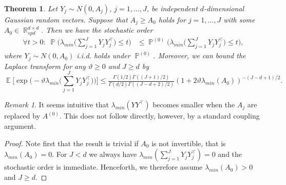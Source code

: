 \documentclass[preprint,aos]{imsart}
\numberwithin{equation}{section}
\newtheorem{theorem}[satz]{Theorem}
\theoremstyle{remark}
\newtheorem{remark}[satz]{Remark}
\DeclareMathOperator{\E}{{\mathbb E}}
\DeclareMathOperator{\R}{{\mathbb R}}
\DeclareMathOperator{\PP}{{\mathbb P}}
\renewcommand{\theta}{\vartheta}
\renewcommand{\le}{\leqslant}
\renewcommand{\ge}{\geqslant}
\providecommand{\mr}{\color{blue}}
\begin{document}
\begin{appendix}
\begin{theorem}\label{ThmBernsteinLower}
Let $Y_j\sim N(0,A_j)$, $j=1,\ldots,J$, be independent $d$-dimensional Gaussian random vectors. Suppose that $A_j\ge A_0$ holds for  $j=1,\ldots,J$ with some $A_0\in\R_{spd}^{d\times d}$.
Then we have the stochastic order
\begin{align*}
\forall t>0:\; \PP\Big(\lambda_{min}\Big(\sum_{j=1}^JY_jY_j^\top\Big)\le t\Big) & \le \PP^{(0)}\Big(\lambda_{min}\Big(\sum_{j=1}^JY_jY_j^\top\Big)\le t\Big),
\end{align*}
where $Y_j\sim N(0,A_0)$ i.i.d. holds under $\PP^{(0)}$. Moreover, we can bound the Laplace transform for any $\theta\ge 0$ and $J\ge d$ by
\[ \E\Big[\exp\Big(-\theta \lambda_{min}\Big(\sum_{j=1}^JY_jY_j^\top\Big)\Big)\Big]\le \tfrac{ \Gamma(1/2)\Gamma((J+1)/2)} {\Gamma(d/2)\Gamma((J-d+2)/2)} (1+2\theta\lambda_{min}(A_0))^{-(J-d+1)/2}.
\]
\begin{comment}
the lower tail bound
\begin{align*}
\PP\Big(\lambda_{\ell}\Big(\frac1J\sum_{j=1}^JY_jY_j^\top\Big)\le t\lambda_\ell(A_0)\Big) & \le (2^{\ell+1}e)^{1/2} \Big(\frac{2e\ell J}{J-\ell+2} t\Big)^{(J-\ell+1)/2},\quad t\in(0,1).
\end{align*}
{\mr also for $\theta\ge 0$:
\[ \E\Big[\exp\Big(-\theta \lambda_{\ell}\Big(\frac1J\sum_{j=1}^JY_jY_j^\top\Big)\Big)\Big]\le \frac{ \Gamma(1/2)\Gamma((J+1)/2)} {\Gamma(\ell/2)\Gamma((J-\ell+2)/2)} (1+2\theta\lambda_\ell(A_0)/J)^{-(J-\ell+1)/2}.
\]
\end{comment}
\end{theorem}

\begin{remark}
It seems intuitive that $\lambda_{min}(YY^\top)$ becomes smaller when the $A_j$ are replaced by $A^{(0)}$. This does not follow directly, however, by a standard coupling argument.
\end{remark}

\begin{proof}
Note first that the result is trivial if $A_0$ is not invertible, that is $\lambda_{min}(A_0)=0$. For $J<d$ we always have $\lambda_{min}(\sum_{j=1}^JY_jY_j^\top)=0$ and the stochastic order is immediate. Henceforth, we therefore assume $\lambda_{min}(A_0)>0$ and $J\ge d$.


\end{proof}
\end{appendix}
\end{document}
